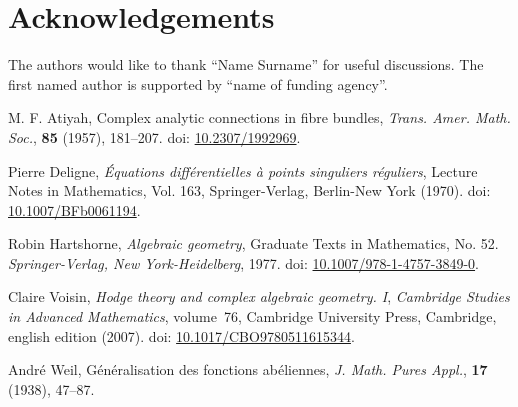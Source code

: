 \documentclass[11pt,a4paper,leqno]{article}
\numberwithin{equation}{subsection}
\theoremstyle{definition}
\begin{document}
\newpage 
\section{Acknowledgements}
\small{The authors would like to thank ``Name Surname'' for useful discussions. 
The first named author is supported by ``name of funding agency''. } 



\begin{thebibliography}{AA}
	\providecommand{\doi}[2][]{doi: \href{https://doi.org/#2}{#2}}
	\providecommand{\arxiv}[2][]{arXiv:\href{https://arxiv.org/abs/#2}{#2}} 
	
	M. F. Atiyah, Complex analytic connections in fibre bundles, 
	\textit{Trans. Amer. Math. Soc.}, \textbf{85} (1957), 181--207. 
	\doi{10.2307/1992969}. 
	
	Pierre Deligne, \textit{\'Equations diff\'erentielles \`a points singuliers r\'eguliers}, 
	Lecture Notes in Mathematics, Vol. 163, Springer-Verlag, Berlin-New York (1970). 
	\doi{10.1007/BFb0061194}. 
	
	Robin Hartshorne, \textit{Algebraic geometry}, Graduate Texts in Mathematics, No. 52. 
	\textit{Springer-Verlag, New York-Heidelberg}, 1977.  
	\doi{10.1007/978-1-4757-3849-0}. 
	
	Claire Voisin, \textit{Hodge theory and complex algebraic geometry. I}, 
	\textit{Cambridge Studies in Advanced Mathematics}, volume~76, 
	Cambridge University Press, Cambridge, english edition (2007). 
	\doi{10.1017/CBO9780511615344}. 
	
	Andr\'e Weil, Généralisation des fonctions abéliennes, 
	\textit{J. Math. Pures Appl.}, \textbf{17} (1938), 47--87. 
\end{thebibliography}
\end{document}
